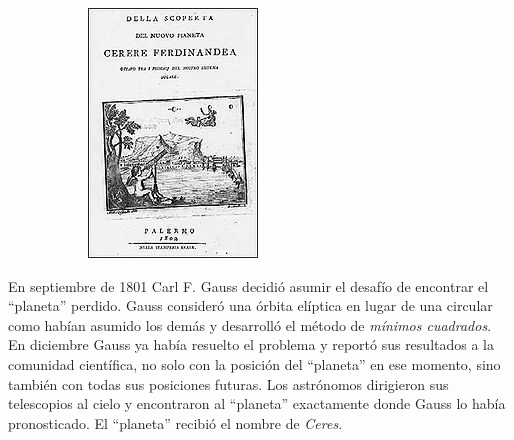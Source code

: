 {\begin{frame}
\begin{figure}
\begin{subfigure}[b]{0.23\textwidth}
			\includegraphics[width=\textwidth]{imagenes/Cerere}
		\end{subfigure}
	\end{figure}
	
	\begin{defi}{}\justifying
		En septiembre de 1801 Carl F. Gauss decidió asumir el desafío de encontrar el ``planeta'' perdido. 
		Gauss consideró una órbita elíptica en lugar de una circular como habían asumido los demás y desarrolló
		el método de \textit{mínimos cuadrados}. En diciembre Gauss ya había resuelto el problema y reportó sus
		resultados a la comunidad científica, no solo con la posición del ``planeta'' en ese momento, sino 
		también con todas sus posiciones futuras. Los astrónomos dirigieron sus telescopios al cielo y encontraron
		al ``planeta'' exactamente donde Gauss lo había pronosticado. El ``planeta'' recibió el nombre de \textit{Ceres}.
	\end{defi}	
	
\end{frame}
}

